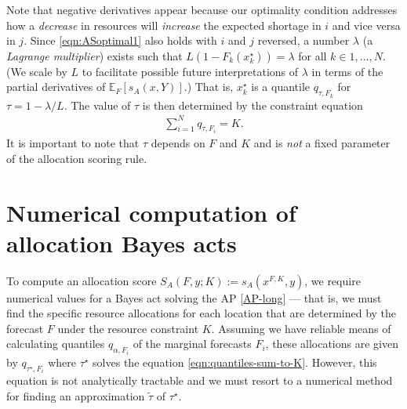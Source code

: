 \documentclass{article}\usepackage[]{graphicx}\usepackage[]{xcolor}
\begin{document}
Note that negative derivatives appear because our optimality condition addresses how a \emph{decrease} in resources will
\emph{increase} the expected shortage in $i$ and vice versa in $j$. Since \eqref{eqn:ASoptimal1} also holds with $i$ and $j$
reversed, a number $\lambda$ (a \emph{Lagrange multiplier}) exists such that
$L(1-F_k(x^{\star}_k)) = \lambda$ for all $k \in 1,\ldots,N$.
(We scale by $L$ to facilitate possible future interpretations of $\lambda$ in terms of the partial derivatives
of $\mathbb{E}_{F} [s_A(x, Y)]$.)
That is, $x^{\star}_k$ is a quantile $q_{\tau,F_k}$ for
$\tau = 1 - \lambda/L$. The value of $\tau$ is then determined by the constraint equation
\begin{align}
\sum_{i=1}^N q_{\tau,F_i} = K. \label{eqn:quantiles-sum-to-K}
\end{align}
It is important to note that $\tau$ depends on $F$ and $K$ and is \emph{not} a fixed parameter
of the allocation scoring rule.

\section{Numerical computation of allocation Bayes acts}
\label{sec:numeric}

To compute an allocation score $S_A(F,y;K) := s_A(x^{F,K},y)$, we require numerical values for a Bayes act solving the
AP \eqref{AP-long} --- that is, we must find the specific resource allocations for each location that are determined by
the forecast $F$ under the resource constraint $K$. Assuming we have reliable means of calculating quantiles
$q_{\alpha,F_i}$ of the marginal forecasts $F_i$, these allocations are given by $q_{\tau^{\star},F_i}$ where
$\tau^{\star}$ solves the equation \eqref{eqn:quantiles-sum-to-K}. However, this equation is not analytically tractable
and we must resort to a numerical method for finding an approximation $\tilde{\tau}$ of $\tau^{\star}$.
\end{document}
